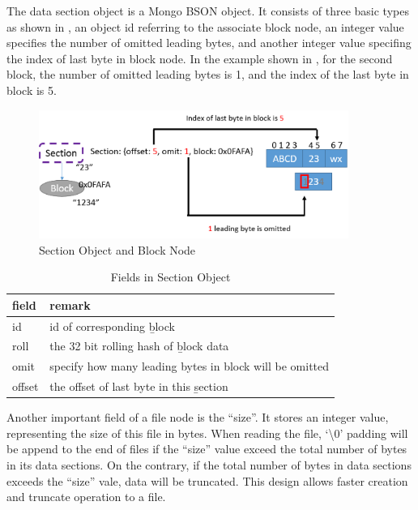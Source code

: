     The data section object is a Mongo BSON object. It consists of three basic types as shown in , an object id referring to the associate block node, an integer value specifies the number of omitted leading bytes, and another integer value specifing the index of last byte in block node. In the example shown in , for the second block, the number of omitted leading bytes is 1, and the index of the last byte in block is 5.

\begin{figure}[hbtp]
\centering
\includegraphics[width=0.9\textwidth]{Chapter-3/figs/fig9.png}
\caption{Section Object and Block Node}
\label{fig:section_and_block}
\end{figure}

\begin{table}
\caption{Fields in Section Object}
\label{tab:section_fields}
\begin{center}
\begin{tabular}{ll}
\toprule
field & remark\\
\midrule
id & id of corresponding \b{block}\\
roll & the 32 bit rolling hash of \b{block} data\\
omit & specify how many leading bytes in block will be omitted\\
offset & the offset of last byte in this \b{section}\\
\bottomrule
\end{tabular}
\end{center}
\end{table}

    Another important field of a file node is the ``size''. It stores an integer value, representing the size of this file in bytes. When reading the file, `\textbackslash0' padding will be append to the end of files if the ``size'' value exceed the total number of bytes in its data sections. On the contrary, if the total number of bytes in data sections exceeds the “size” vale, data will be truncated. This design allows faster creation and truncate operation to a file.

